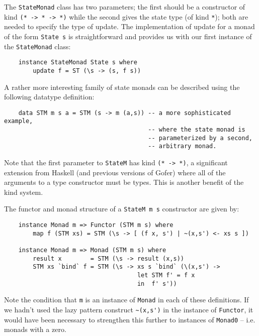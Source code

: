 The \verb"StateMonad" class has two parameters; the first should be a
constructor of kind \verb"(* -> * -> *)" while the second gives the state
type (of kind \verb"*"); both are needed to specify the type of update.
The implementation of update for a monad of the form \verb"State s" is
straightforward and provides us with our first instance of the
\verb"StateMonad" class:
\begin{verbatim}
    instance StateMonad State s where
        update f = ST (\s -> (s, f s))
\end{verbatim}
A rather more interesting family of state monads can be described using
the following datatype definition:
\begin{verbatim}
    data STM m s a = STM (s -> m (a,s)) -- a more sophisticated example,
                                        -- where the state monad is
                                        -- parameterized by a second,
                                        -- arbitrary monad.
\end{verbatim}
Note that the first parameter to \verb"StateM" has kind \verb"(* -> *)", a
significant extension from Haskell (and previous versions of Gofer)
where all of the arguments to a type constructor must be types.  This
is another benefit of the kind system.

The functor and monad structure of a \verb"StateM m s" constructor are given
by:
\begin{verbatim}
    instance Monad m => Functor (STM m s) where
        map f (STM xs) = STM (\s -> [ (f x, s') | ~(x,s') <- xs s ])

    instance Monad m => Monad (STM m s) where
        result x        = STM (\s -> result (x,s))
        STM xs `bind` f = STM (\s -> xs s `bind` (\(x,s') ->
                                     let STM f' = f x
                                     in  f' s'))
\end{verbatim}
Note the condition that \verb"m" is an instance of \verb"Monad" in each of these
definitions.  If we hadn't used the lazy pattern construct \verb"~(x,s')" in
the instance of \verb"Functor", it would have been necessary to strengthen
this further to instances of \verb"Monad0" -- i.e. monads with a zero.

